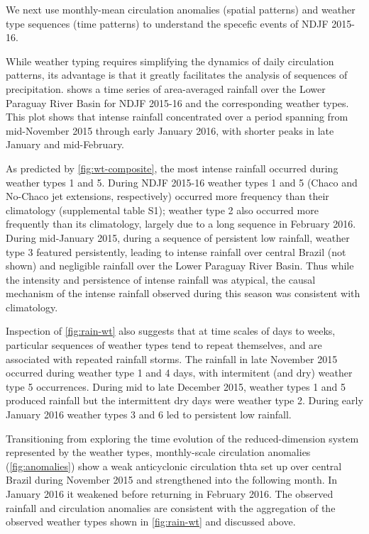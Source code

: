 \documentclass[twocol]{ametsoc}
\begin{document}
We next use monthly-mean circulation anomalies (spatial patterns) and weather type sequences (time patterns) to understand the specefic events of NDJF 2015-16.

While weather typing requires simplifying the dynamics of daily circulation patterns, its advantage is that it greatly facilitates the analysis of sequences of precipitation.
 shows a time series of area-averaged rainfall over the Lower Paraguay River Basin for NDJF 2015-16 and the corresponding weather types.
This plot shows that intense rainfall concentrated over a period spanning from mid-November 2015 through early January 2016, with shorter peaks in late January and mid-February.

As predicted by \cref{fig:wt-composite}, the most intense rainfall occurred during weather types 1 and 5.
During NDJF 2015-16 weather types 1 and 5 (Chaco and No-Chaco jet extensions, respectively) occurred more frequency than their climatology (supplemental table S1); weather type 2 also occurred more frequently than its climatology, largely due to a long sequence in February 2016.
During mid-January 2015, during a sequence of persistent low rainfall, weather type 3 featured persistently, leading to intense rainfall over central Brazil (not shown) and negligible rainfall over the Lower Paraguay River Basin.
Thus while the intensity and persistence of intense rainfall was atypical, the causal mechanism of the intense rainfall observed during this season was consistent with climatology.

Inspection of \cref{fig:rain-wt} also suggests that at time scales of days to weeks, particular sequences of weather types tend to repeat themselves, and are associated with repeated rainfall storms.
The rainfall in late November 2015 occurred during weather type 1 and 4 days, with intermitent (and dry) weather type 5 occurrences.
During mid to late December 2015, weather types 1 and 5 produced rainfall but the intermittent dry days were weather type 2.
During early January 2016 weather types 3 and 6 led to persistent low rainfall.

Transitioning from exploring the time evolution of the reduced-dimension system represented by the weather types, monthly-scale circulation anomalies (\cref{fig:anomalies}) show a weak anticyclonic circulation thta set up over central Brazil during November 2015 and strengthened into the following month.
In January 2016 it weakened before returning in February 2016.
The observed rainfall and circulation anomalies are consistent with the aggregation of the observed weather types shown in \cref{fig:rain-wt} and discussed above.
\end{document}
